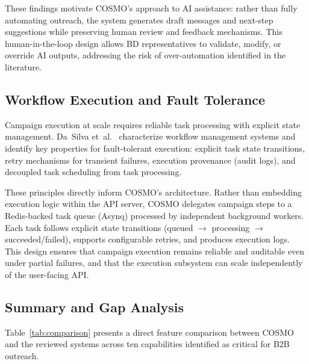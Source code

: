 These findings motivate COSMO's approach to AI assistance: rather than fully automating outreach, the system generates draft messages and next-step suggestions while preserving human review and feedback mechanisms. This human-in-the-loop design allows BD representatives to validate, modify, or override AI outputs, addressing the risk of over-automation identified in the literature.

\subsection{Workflow Execution and Fault Tolerance}

Campaign execution at scale requires reliable task processing with explicit state management. Da~Silva et~al.~\cite{dasilva2017wfms} characterize workflow management systems and identify key properties for fault-tolerant execution: explicit task state transitions, retry mechanisms for transient failures, execution provenance (audit logs), and decoupled task scheduling from task processing.

These principles directly inform COSMO's architecture. Rather than embedding execution logic within the API server, COSMO delegates campaign steps to a Redis-backed task queue (Asynq) processed by independent background workers. Each task follows explicit state transitions (queued $\to$ processing $\to$ succeeded/failed), supports configurable retries, and produces execution logs. This design ensures that campaign execution remains reliable and auditable even under partial failures, and that the execution subsystem can scale independently of the user-facing API.

\subsection{Summary and Gap Analysis}

Table~\ref{tab:comparison} presents a direct feature comparison between COSMO and the reviewed systems across ten capabilities identified as critical for B2B outreach.

